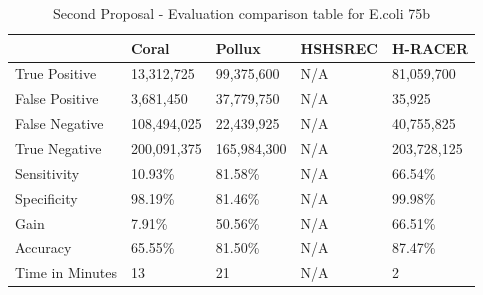 \documentclass[12pt]{llncs}
\newcommand{\TBstrut}{{\rule{0pt}{7ex}}{\rule[2ex]{0pt}{0pt}}} %
\begin{document}
\begin{longtable}{|m{33mm}|m{20mm}|m{20mm}|m{20mm}|m{20mm}|}
        \caption{\label{tab:eval-4}Second Proposal - Evaluation comparison table for E.coli 75b}\\
        \hline
           & Coral & Pollux & HSHSREC & H-RACER\cellcolor{DarkGray} \TBstrut\\ %
        \hline
           True Positive & 13,312,725 & 99,375,600 & N/A & 81,059,700\cellcolor{LightGray} \TBstrut\\ %
        \hline
           False Positive & 3,681,450 & 37,779,750 & N/A & 35,925\cellcolor{LightGray} \TBstrut\\ %
        \hline
           False Negative & 108,494,025 & 22,439,925 & N/A & 40,755,825\cellcolor{LightGray} \TBstrut\\ %
        \hline
           True Negative & 200,091,375 & 165,984,300 & N/A & 203,728,125\cellcolor{LightGray} \TBstrut\\ %
        \hline
           Sensitivity & 10.93\% & 81.58\% & N/A & 66.54\%\cellcolor{LightGray} \TBstrut\\ %
        \hline
           Specificity & 98.19\% & 81.46\% & N/A & 99.98\%\cellcolor{LightGray} \TBstrut\\ %
        \hline
           Gain & 7.91\% & 50.56\% & N/A & 66.51\%\cellcolor{LightGray} \TBstrut\\ %
        \hline
           Accuracy & 65.55\% & 81.50\% & N/A & 87.47\%\cellcolor{LightGray} \TBstrut\\ %
        \hline
           Time in Minutes& 13 & 21 & N/A & 2\cellcolor{LightGray} \TBstrut\\ %
        \hline
\end{longtable}

\newpage
\end{document}

